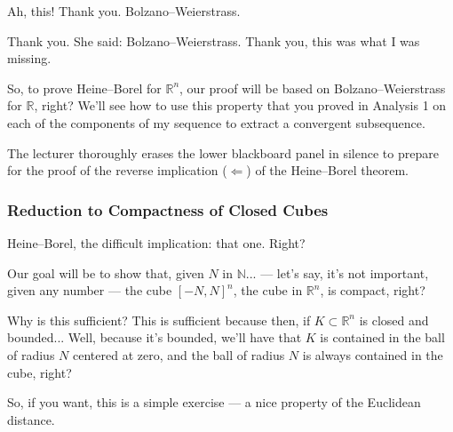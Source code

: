 \begin{proofWrapper}
\begin{speech}[00:49:28 - 00:50:04]
Ah, this! Thank you. Bolzano--Weierstrass.

Thank you. She said: Bolzano--Weierstrass. Thank you, this was what I was missing.

So, to prove Heine--Borel for $\mathbb{R}^n$, our proof will be based on Bolzano--Weierstrass for $\mathbb{R}$, right? We'll see how to use this property that you proved in Analysis 1 on each of the components of my sequence to extract a convergent subsequence.
\end{speech}

\begin{note}
The lecturer thoroughly erases the lower blackboard panel in silence to prepare for the proof of the reverse implication ($\Longleftarrow$) of the Heine--Borel theorem.
\end{note}

\subsubsection{Reduction to Compactness of Closed Cubes}

\begin{speech}[00:50:58 - 00:52:33]
Heine--Borel, the difficult implication: that one.  Right?

Our goal will be to show that, given $N$ in $\mathbb{N}$...  --- let's say, it's not important, given any number --- the cube $[-N, N]^n$,  the cube in $\mathbb{R}^n$, is compact, right? 

Why is this sufficient? This is sufficient  because then, if $K \subset \mathbb{R}^n$  is closed and bounded...  Well, because it's bounded, we'll have that $K$ is contained in the ball of radius $N$ centered at zero,  and the ball of radius $N$ is always contained in the cube, right? 
\end{speech}

\begin{speech}[00:52:33 - 00:54:20]
So, if you want, this is a simple exercise --- a nice property of the Euclidean distance. 


\end{speech}
\end{proofWrapper}
